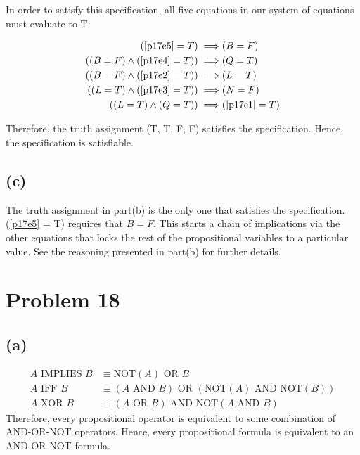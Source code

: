 \documentclass{article}
\begin{document}
In order to satisfy this specification, all five equations in our system of equations must evaluate to T:

\begin{align*}
	(\eqref{p17e5} = T) \implies                 & (B = F)             \\
	((B = F) \land (\eqref{p17e4} = T)) \implies & (Q = T)             \\
	((B = F) \land (\eqref{p17e2} = T)) \implies & (L = T)             \\
	((L = T) \land (\eqref{p17e3} = T)) \implies & (N = F)             \\
	((L = T) \land (Q = T)) \implies             & (\eqref{p17e1} = T)
\end{align*}

Therefore, the truth assignment (T, T, F, F) satisfies the specification. Hence, the specification is satisfiable.

\subsection{(c)}
The truth assignment in part(b) is the only one that satisfies the specification. (\eqref{p17e5} = T) requires that $B = F$. This starts a chain of implications via the other equations that locks the rest of the propositional variables to a particular value. See the reasoning presented in part(b) for further details.

\pagebreak

\section{Problem 18}
\subsection{(a)}
\begin{align*}
	A \text{ IMPLIES } B & \equiv \text{NOT}(A) \text{ OR } B                                               \\
	A \text{ IFF } B     & \equiv (A \text{ AND } B) \text{ OR } (\text{NOT}(A) \text{ AND } \text{NOT}(B)) \\
	A \text{ XOR } B     & \equiv (A \text{ OR } B) \text{ AND NOT}(A \text{ AND } B)
\end{align*}
Therefore, every propositional operator is equivalent to some combination of AND-OR-NOT operators. Hence, every propositional formula is equivalent to an AND-OR-NOT formula.
\end{document}
